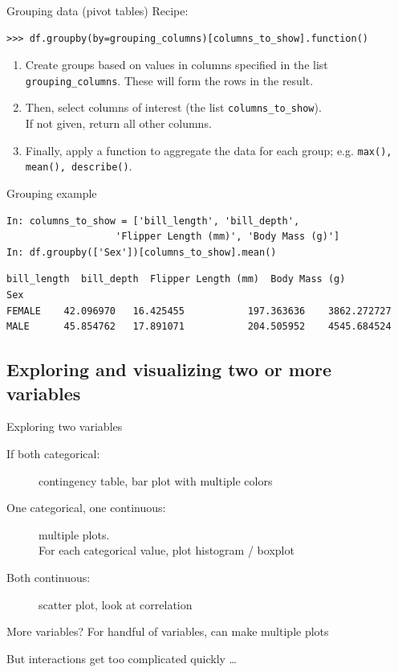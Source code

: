 \documentclass[aspectratio=169,usenames,dvipsnames]{beamer}
\begin{document}
\begin{frame}[fragile]{Grouping data (pivot tables)}
Recipe:
\begin{lstlisting}
>>> df.groupby(by=grouping_columns)[columns_to_show].function()
\end{lstlisting}

\begin{enumerate}
\item Create groups based on values in columns specified
    in the list \lstinline{grouping_columns}.
    These will form the rows in the result.
\item Then, select columns of interest (the list \lstinline{columns_to_show}). \\
    If not given, return all other columns.
\item Finally, apply a function to aggregate the data for each group;
    e.g. \lstinline{max(), mean(), describe()}.
\end{enumerate}
\end{frame}


\begin{frame}[fragile]{Grouping example}
\begin{lstlisting}
In: columns_to_show = ['bill_length', 'bill_depth',
                   'Flipper Length (mm)', 'Body Mass (g)']
In: df.groupby(['Sex'])[columns_to_show].mean()
\end{lstlisting}\vspace{-1em}\begin{lstlisting}[style=plain]
        bill_length  bill_depth  Flipper Length (mm)  Body Mass (g)
Sex
FEMALE    42.096970   16.425455           197.363636    3862.272727
MALE      45.854762   17.891071           204.505952    4545.684524
\end{lstlisting}
\end{frame}





\subsection{Exploring and visualizing two or more variables}
\frame{\tableofcontents[currentsubsection]}
\begin{frame}{Exploring two variables}
\begin{description}
    \item[If both categorical:]
            contingency table, bar plot with multiple colors
    \item[One categorical, one continuous:] multiple plots.\\
            For each categorical value, plot histogram / boxplot
    \item[Both continuous:]
         scatter plot, look at correlation
\end{description}

\pause\vspace{1em}
More variables? For handful of variables, can make multiple plots

But interactions get too complicated quickly \dots
\end{frame}
\end{document}
